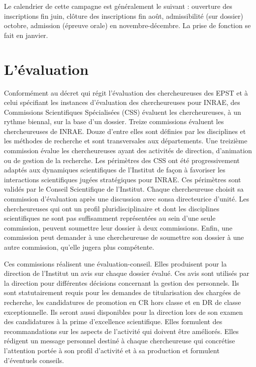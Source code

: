 Le calendrier de cette campagne est g\'en\'eralement le suivant : ouverture des inscriptions fin juin, cl\^oture des inscriptions fin ao\^ut, admissibilit\'e (sur dossier) octobre, admission (\'epreuve orale) en novembre-d\'ecembre. La prise de fonction se fait en janvier.

\section{L'\'evaluation}
Conform\'ement au d\'ecret qui r\'egit l'\'evaluation des chercheur\mp euse\mp s des EPST et \`a celui sp\'ecifiant les instances d'\'evaluation des chercheur\mp euse\mp s pour INRAE, des Commissions Scientifiques Sp\'ecialis\'ees (CSS) \'evaluent les chercheur\mp euse\mp s, \`a un rythme biennal, sur la base d'un dossier. Treize commissions \'evaluent les chercheur\mp euse\mp s de INRAE. Douze d'entre elles sont d\'efinies par les disciplines et les m\'ethodes de recherche et sont transversales aux d\'epartements. Une treizi\`eme commission \'evalue les chercheur\mp euse\mp s ayant des activit\'es de direction, d'animation ou de gestion de la recherche. Les p\'erim\`etres des CSS ont \'et\'e progressivement adapt\'es aux dynamiques scientifiques de l'Institut de fa\c{c}on \`a favoriser les interactions scientifiques jug\'ees strat\'egiques pour INRAE. Ces p\'erim\`etres sont valid\'es par le Conseil Scientifique de l'Institut. Chaque chercheur\mp euse choisit sa commission d'\'evaluation apr\`es une discussion avec son\mp sa directeur\mp ice d'unit\'e. Les chercheur\mp euse\mp s qui ont un profil pluridisciplinaire et dont les disciplines scientifiques ne sont pas suffisamment repr\'esent\'ees au sein d'une seule commission, peuvent soumettre leur dossier \`a deux commissions. Enfin, une commission peut demander \`a une chercheur\mp euse de soumettre son dossier \`a une autre commission, qu'elle jugera plus comp\'etente.

Ces commissions r\'ealisent une \'evaluation-conseil. Elles produisent pour la direction de l'Institut un avis sur chaque dossier \'evalu\'e. Ces avis sont utilis\'es par la direction pour diff\'erentes d\'ecisions concernant la gestion des personnels. Ils sont statutairement requis pour les demandes de titularisation des charg\'e\mp e\mp s de recherche, les candidatures de promotion en CR hors classe et en DR de classe exceptionnelle. Ils seront aussi disponibles pour la direction lors de son examen des candidatures \`a la prime d'excellence scientifique. Elles formulent des recommandations sur les aspects de l'activit\'e qui doivent \^etre am\'elior\'es. Elles r\'edigent un message personnel destin\'e \`a chaque chercheur\mp euse qui concr\'etise l'attention port\'ee \`a son profil d'activit\'e et \`a sa production et formulent d'\'eventuels conseils.

